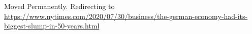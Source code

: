Moved Permanently. Redirecting to
\url{https://www.nytimes.com/2020/07/30/business/the-german-economy-had-its-biggest-slump-in-50-years.html}
